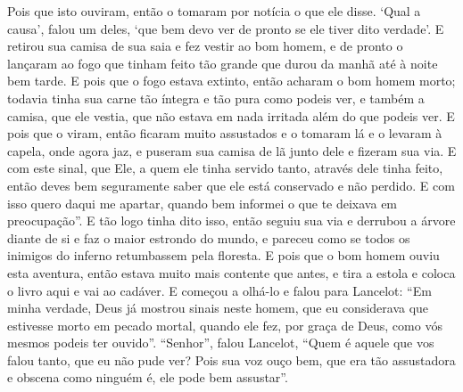 Pois que isto ouviram, então o tomaram por notícia o que ele disse. ‘Qual a
causa’, falou um deles, ‘que bem devo ver de pronto se ele tiver dito verdade’.
E retirou sua camisa de sua saia e fez vestir ao bom homem, e de pronto o
lançaram ao fogo que tinham feito tão grande que durou da manhã até à noite bem
tarde. E pois que o fogo estava extinto, então acharam o bom homem morto;
todavia tinha sua carne tão íntegra e tão pura como podeis ver, e também a
camisa, que ele vestia, que não estava em nada irritada além do que podeis ver.
E pois que o viram, então ficaram muito assustados e o tomaram lá e o levaram à
capela, onde agora jaz, e puseram sua camisa de lã junto dele e fizeram sua
via. E com este sinal, que Ele, a quem ele tinha servido tanto, através dele
tinha feito, então deves bem seguramente saber que ele está conservado e não
perdido. E com isso quero daqui me apartar, quando bem informei o que te
deixava em preocupação”.  E tão logo tinha dito isso, então
seguiu sua via e derrubou a árvore diante de si e faz o maior estrondo do
mundo, e pareceu como se todos os inimigos do inferno retumbassem pela
floresta. E pois que o bom homem ouviu esta aventura, então estava muito mais
contente que antes, e tira a estola e coloca o livro aqui e vai ao cadáver. E
começou a olhá-lo e falou para Lancelot: “Em minha verdade, Deus já mostrou
sinais neste homem, que eu considerava que estivesse morto em pecado mortal,
quando ele fez, por graça de Deus, como vós mesmos podeis ter ouvido”.
“Senhor”, falou Lancelot, “Quem é aquele que vos falou tanto, que eu não pude
ver? Pois sua voz ouço bem, que era tão assustadora e obscena  como ninguém é,
ele pode bem assustar”.

